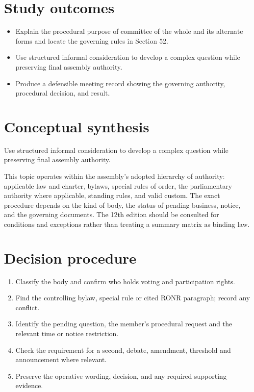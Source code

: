 \documentclass[11pt]{article}
\begin{document}
\SuiteOpen
{}
\section{Study outcomes}
\begin{itemize}[leftmargin=*,itemsep=4pt]
\item Explain the procedural purpose of committee of the whole and its alternate forms and locate the governing rules in Section 52.
\item Use structured informal consideration to develop a complex question while preserving final assembly authority.
\item Produce a defensible meeting record showing the governing authority, procedural decision, and result.
\end{itemize}

\section{Conceptual synthesis}
Use structured informal consideration to develop a complex question while preserving final assembly authority.

This topic operates within the assembly’s adopted hierarchy of authority: applicable law and charter, bylaws, special rules of order, the parliamentary authority where applicable, standing rules, and valid custom. The exact procedure depends on the kind of body, the status of pending business, notice, and the governing documents. The 12th edition should be consulted for conditions and exceptions rather than treating a summary matrix as binding law.
\section{Decision procedure}
\begin{enumerate}[leftmargin=*,itemsep=4pt]
\item Classify the body and confirm who holds voting and participation rights.
\item Find the controlling bylaw, special rule or cited RONR paragraph; record any conflict.
\item Identify the pending question, the member’s procedural request and the relevant time or notice restriction.
\item Check the requirement for a second, debate, amendment, threshold and announcement where relevant.
\item Preserve the operative wording, decision, and any required supporting evidence.
\end{enumerate}
\end{document}
